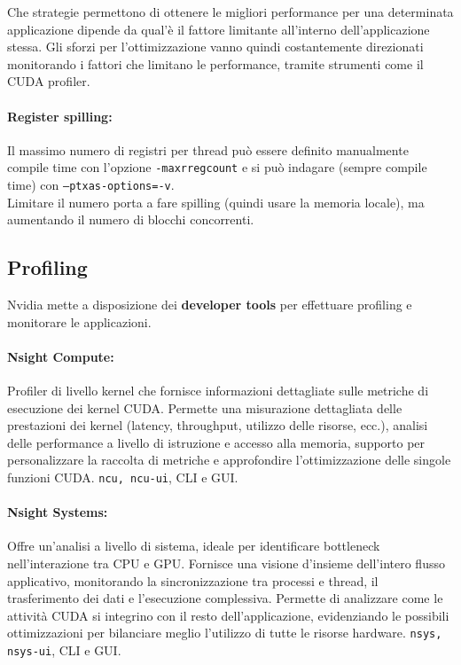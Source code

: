 Che strategie permettono di ottenere le migliori performance per una determinata applicazione dipende da qual'è il fattore limitante all'interno dell'applicazione stessa. Gli sforzi per l'ottimizzazione vanno quindi costantemente direzionati monitorando i fattori che limitano le performance, tramite strumenti come il CUDA profiler. \\

\newpage

\paragraph{Register spilling:} Il massimo numero di registri per thread può essere definito manualmente compile time con l'opzione \texttt{-maxrregcount} e si può indagare (sempre compile time) con \texttt{--ptxas-options=-v}. \\
Limitare il numero porta a fare spilling (quindi usare la memoria locale), ma aumentando il numero di blocchi concorrenti. \\ %

\subsection{Profiling}

Nvidia mette a disposizione dei \textbf{developer tools} per effettuare profiling e monitorare le applicazioni. \\

\paragraph{Nsight Compute:} Profiler di livello kernel che fornisce informazioni dettagliate sulle metriche di esecuzione dei kernel CUDA. Permette una misurazione dettagliata delle prestazioni dei kernel (latency, throughput, utilizzo delle risorse, ecc.), analisi delle performance a livello di istruzione e accesso alla memoria, supporto per personalizzare la raccolta di metriche e approfondire l’ottimizzazione delle singole funzioni CUDA. \texttt{ncu, ncu-ui}, CLI e GUI.\\

\paragraph{Nsight Systems:} Offre un'analisi a livello di sistema, ideale per identificare bottleneck nell'interazione tra CPU e GPU. Fornisce una visione d’insieme dell'intero flusso applicativo, monitorando la sincronizzazione tra processi e thread, il trasferimento dei dati e l'esecuzione complessiva. Permette di analizzare come le attività CUDA si integrino con il resto dell'applicazione, evidenziando le possibili ottimizzazioni per bilanciare meglio l’utilizzo di tutte le risorse hardware. \texttt{nsys, nsys-ui}, CLI e GUI.\\

